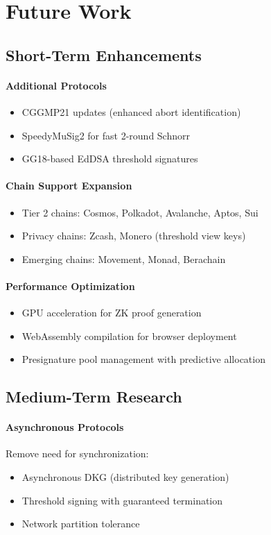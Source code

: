 \section{Future Work}


\subsection{Short-Term Enhancements}

\paragraph{Additional Protocols}
\begin{itemize}
\item CGGMP21 updates (enhanced abort identification)
\item SpeedyMuSig2 for fast 2-round Schnorr
\item GG18-based EdDSA threshold signatures
\end{itemize}

\paragraph{Chain Support Expansion}
\begin{itemize}
\item Tier 2 chains: Cosmos, Polkadot, Avalanche, Aptos, Sui
\item Privacy chains: Zcash, Monero (threshold view keys)
\item Emerging chains: Movement, Monad, Berachain
\end{itemize}

\paragraph{Performance Optimization}
\begin{itemize}
\item GPU acceleration for ZK proof generation
\item WebAssembly compilation for browser deployment
\item Presignature pool management with predictive allocation
\end{itemize}

\subsection{Medium-Term Research}

\paragraph{Asynchronous Protocols} Remove need for synchronization:
\begin{itemize}
\item Asynchronous DKG (distributed key generation)
\item Threshold signing with guaranteed termination
\item Network partition tolerance
\end{itemize}

